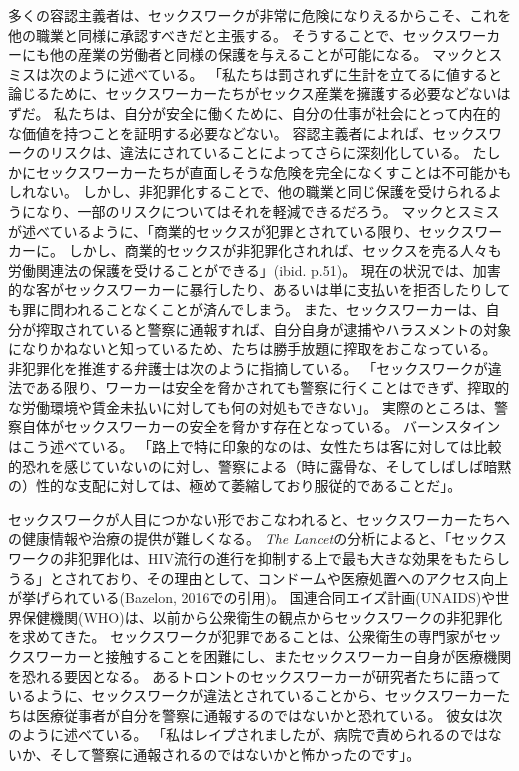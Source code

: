 \documentclass[paper=a4,book,openany]{jlreq}
\newcommand{\ig}[1]{}           %
\begin{document}
多くの容認主義者は、セックスワークが非常に危険になりえるからこそ、これを他の職業と同様に承認すべきだと主張する。
そうすることで、セックスワーカーにも他の産業の労働者と同様の保護を与えることが可能になる。
マックとスミスは次のように述べている。
「私たちは罰されずに生計を立てるに値すると論じるために、セックスワーカーたちがセックス産業を擁護する必要などないはずだ。
私たちは、自分が安全に働くために、自分の仕事が社会にとって内在的な価値を持つことを証明する必要などない\citep[p.55]{mac18:_revol_prost}。
容認主義者によれば、セックスワークのリスクは、違法にされていることによってさらに深刻化している。
たしかにセックスワーカーたちが直面しそうな危険を完全になくすことは不可能かもしれない。
しかし、非犯罪化することで、他の職業と同じ保護を受けられるようになり、一部のリスクについてはそれを軽減できるだろう。
マックとスミスが述べているように、「商業的セックスが犯罪とされている限り、セックスワーカーに。
しかし、商業的セックスが非犯罪化されれば、セックスを売る人々も労働関連法の保護を受けることができる」(ibid. p.51)。
現在の状況では、加害的な客がセックスワーカーに暴行したり、あるいは単に支払いを拒否したりしても罪に問われることなくことが済んでしまう。
また、セックスワーカーは、自分が搾取されていると警察に通報すれば、自分自身が逮捕やハラスメントの対象になりかねないと知っているため、たちは勝手放題に搾取をおこなっている。
非犯罪化を推進する弁護士は次のように指摘している。
「セックスワークが違法である限り、ワーカーは安全を脅かされても警察に行くことはできず、搾取的な労働環境や賃金未払いに対しても何の対処もできない」\citep{shugerman17:_prost_could_be_legal_calif}。
実際のところは、警察自体がセックスワーカーの安全を脅かす存在となっている。
バーンスタインはこう述べている。
「路上で特に印象的なのは、女性たちは客に対しては比較的恐れを感じていないのに対し、警察による（時に露骨な、そしてしばしば暗黙の）性的な支配に対しては、極めて萎縮しており服従的であることだ」\citep[p.108]{bernstein99:_whats_wrong_prost}。
\ig{Elizabeth Bernstein}

セックスワークが人目につかない形でおこなわれると、セックスワーカーたちへの健康情報や治療の提供が難しくなる。
\emph{The Lancet}の分析によると、「セックスワークの非犯罪化は、HIV流行の進行を抑制する上で最も大きな効果をもたらしうる」とされており、その理由として、コンドームや医療処置へのアクセス向上が挙げられている(Bazelon, 2016での引用)。
\nocite{bazelon16:_shoul_prost_be_crime}
国連合同エイズ計画(UNAIDS)や世界保健機関(WHO)は、以前から公衆衛生の観点からセックスワークの非犯罪化を求めてきた。
セックスワークが犯罪であることは、公衆衛生の専門家がセックスワーカーと接触することを困難にし、またセックスワーカー自身が医療機関を恐れる要因となる。
あるトロントのセックスワーカーが研究者たちに語っているように、セックスワークが違法とされていることから、セックスワーカーたちは医療従事者が自分を警察に通報するのではないかと恐れている。
彼女は次のように述べている。
「私はレイプされましたが、病院で責められるのではないか、そして警察に通報されるのではないかと怖かったのです」\citep{neal14:_street_based_sex_worker_needs_asses}。
\end{document}
